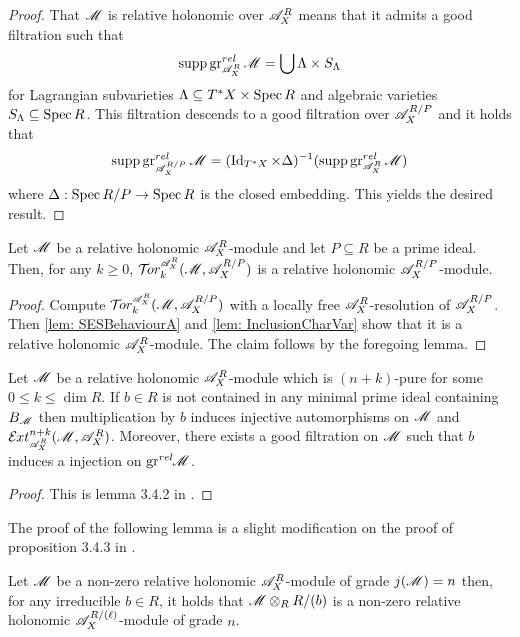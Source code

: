 \begin{proof}
  That $\mathscr{M}$ is relative holonomic over $\mathscr{A}_X^{R}$ means that it admits a good filtration such that
  $$\operatorname{supp} \operatorname{gr}_{\mathscr{A}_X^R}^{rel} \mathscr{M}  = \bigcup \Lambda \times S_\Lambda $$
  for Lagrangian subvarieties $\Lambda \subseteq T^* X \times \operatorname{Spec} R$ and algebraic varieties $S_\Lambda \subseteq \operatorname{Spec} R$.
  This filtration descends to a good filtration over $\mathscr{A}_{X}^{R/P}$ and it holds that
  $$\operatorname{supp} \operatorname{gr}_{\mathscr{A}_X^{R/P}}^{rel}\mathscr{M} = (\operatorname{Id}_{T^*X} \times \Delta)^{-1}(\operatorname{supp} \operatorname{gr}_{\mathscr{A}_X^R}^{rel}\mathscr{M})$$
  where $\Delta:\operatorname{Spec} R/P\to \operatorname{Spec} R$ is the closed embedding.
  This yields the desired result.
\end{proof}
\begin{lemma}\label{lem: TorRelHol}
  Let $\mathscr{M}$ be a relative holonomic $\mathscr{A}_X^R$-module and let $P\subseteq R$ be a prime ideal. Then, for any $k\geq 0$, $\Tr{\A_X^R}{k}(\M, \A_X^{R/P})$ is a relative holonomic $\mathscr{A}_X^{R/P}$-module.
 \end{lemma}
\begin{proof}
  Compute $\Tr{\A_X^R}{k}(\M, \A_X^{R/P})$ with a locally free $\mathscr{A}_X^R$-resolution of $\mathscr{A}_X^{R/P}$.
  Then \cref{lem: SESBehaviourA} and \cref{lem: InclusionCharVar} show that it is a relative holonomic $\mathscr{A}_X^R$-module.
  The claim follows by the foregoing lemma.
\end{proof}
\begin{lemma}\label{lem: NotBernsteinInjectiveAutomorphism}
  Let $\mathscr{M}$ be a relative holonomic $\mathscr{A}_X^R$-module which is $(n+k)$-pure for some $0\leq k \leq \dim R$. If $b\in R$ is not contained in any minimal prime ideal containing $B_{\mathscr{M}}$ then multiplication by $b$ induces injective automorphisms on $\mathscr{M}$ and $\Ex{\A_X^R}{n+k}(\M,\A_X^R)$. Moreover, there exists a good filtration on $\mathscr{M}$ such that $b$ induces a injection on $\operatorname{gr}^{rel}\mkern-5mu \mathscr{M}$.
\end{lemma}
\begin{proof}
  This is lemma 3.4.2 in \cite{budur2019zero}.
\end{proof}
The proof of the following lemma is a slight modification on the proof of proposition 3.4.3 in \cite{budur2019zero}.
\begin{lemma}\label{lem: RestrictToCM}
  Let $\mathscr{M}$ be a non-zero relative holonomic $\mathscr{A}_X^R$-module of grade $j(\mathscr{M}) = n$  then, for any irreducible $b\in R$, it holds that $\mathscr{M} \otimes_R R/(b)$ is a non-zero relative holonomic  $\mathscr{A}_X^{R/(\ell)}$-module of grade $n$.
\end{lemma}

